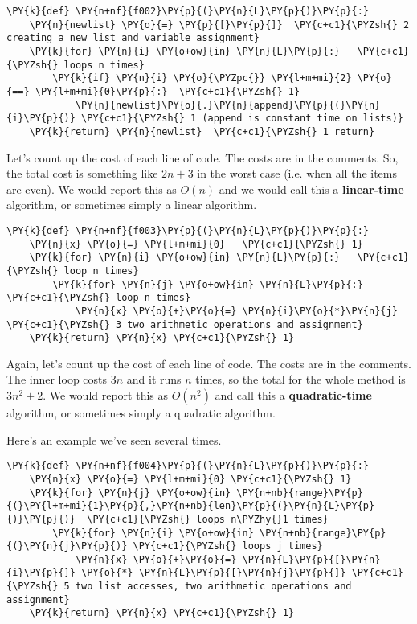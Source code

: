 \begin{Verbatim}[commandchars=\\\{\}]
\PY{k}{def} \PY{n+nf}{f002}\PY{p}{(}\PY{n}{L}\PY{p}{)}\PY{p}{:}    
    \PY{n}{newlist} \PY{o}{=} \PY{p}{[}\PY{p}{]}  \PY{c+c1}{\PYZsh{} 2 creating a new list and variable assignment}
    \PY{k}{for} \PY{n}{i} \PY{o+ow}{in} \PY{n}{L}\PY{p}{:}   \PY{c+c1}{\PYZsh{} loops n times}
        \PY{k}{if} \PY{n}{i} \PY{o}{\PYZpc{}} \PY{l+m+mi}{2} \PY{o}{==} \PY{l+m+mi}{0}\PY{p}{:}  \PY{c+c1}{\PYZsh{} 1}
            \PY{n}{newlist}\PY{o}{.}\PY{n}{append}\PY{p}{(}\PY{n}{i}\PY{p}{)} \PY{c+c1}{\PYZsh{} 1 (append is constant time on lists)}
    \PY{k}{return} \PY{n}{newlist}  \PY{c+c1}{\PYZsh{} 1 return}
\end{Verbatim}



Let's count up the cost of each line of code.
The costs are in the comments.
So, the total cost is something like $2n+3$ in the worst case (i.e. when all the items are even).
We would report this as $O(n)$ and we would call this a \textbf{linear-time} algorithm, or sometimes simply a linear algorithm.

\begin{Verbatim}[commandchars=\\\{\}]
\PY{k}{def} \PY{n+nf}{f003}\PY{p}{(}\PY{n}{L}\PY{p}{)}\PY{p}{:}
    \PY{n}{x} \PY{o}{=} \PY{l+m+mi}{0}   \PY{c+c1}{\PYZsh{} 1}
    \PY{k}{for} \PY{n}{i} \PY{o+ow}{in} \PY{n}{L}\PY{p}{:}   \PY{c+c1}{\PYZsh{} loop n times}
        \PY{k}{for} \PY{n}{j} \PY{o+ow}{in} \PY{n}{L}\PY{p}{:}   \PY{c+c1}{\PYZsh{} loop n times}
            \PY{n}{x} \PY{o}{+}\PY{o}{=} \PY{n}{i}\PY{o}{*}\PY{n}{j}  \PY{c+c1}{\PYZsh{} 3 two arithmetic operations and assignment}
    \PY{k}{return} \PY{n}{x} \PY{c+c1}{\PYZsh{} 1}
\end{Verbatim}



Again, let's count up the cost of each line of code.
The costs are in the comments.
The inner loop costs $3n$ and it runs $n$ times, so the total for the whole method is $3n^2 + 2$.
We would report this as $O(n^2)$ and call this a \textbf{quadratic-time} algorithm, or sometimes simply a quadratic algorithm.


Here's an example we've seen several times.

\begin{Verbatim}[commandchars=\\\{\}]
\PY{k}{def} \PY{n+nf}{f004}\PY{p}{(}\PY{n}{L}\PY{p}{)}\PY{p}{:}
    \PY{n}{x} \PY{o}{=} \PY{l+m+mi}{0} \PY{c+c1}{\PYZsh{} 1}
    \PY{k}{for} \PY{n}{j} \PY{o+ow}{in} \PY{n+nb}{range}\PY{p}{(}\PY{l+m+mi}{1}\PY{p}{,}\PY{n+nb}{len}\PY{p}{(}\PY{n}{L}\PY{p}{)}\PY{p}{)}  \PY{c+c1}{\PYZsh{} loops n\PYZhy{}1 times}
        \PY{k}{for} \PY{n}{i} \PY{o+ow}{in} \PY{n+nb}{range}\PY{p}{(}\PY{n}{j}\PY{p}{)} \PY{c+c1}{\PYZsh{} loops j times}
            \PY{n}{x} \PY{o}{+}\PY{o}{=} \PY{n}{L}\PY{p}{[}\PY{n}{i}\PY{p}{]} \PY{o}{*} \PY{n}{L}\PY{p}{[}\PY{n}{j}\PY{p}{]} \PY{c+c1}{\PYZsh{} 5 two list accesses, two arithmetic operations and assignment}
    \PY{k}{return} \PY{n}{x} \PY{c+c1}{\PYZsh{} 1}
\end{Verbatim}



